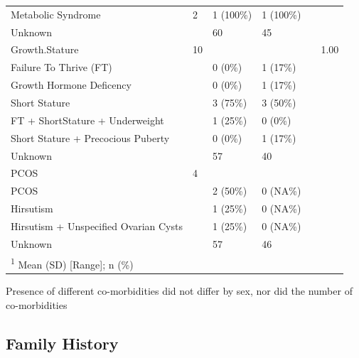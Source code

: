 \documentclass[
]{article}
\begin{document}
\begin{table}[!h]
\begin{tabular}[t]{llllll}
Metabolic Syndrome & 2 & 1 (100\%) & 1 (100\%) &  & \\
\addlinespace
\hspace{1em}Unknown &  & 60 & 45 &  & \\
Growth.Stature & 10 &  &  &  & 1.00\\
\hspace{1em}Failure To Thrive (FT) &  & 0 (0\%) & 1 (17\%) &  & \\
\hspace{1em}Growth Hormone Deficency &  & 0 (0\%) & 1 (17\%) &  & \\
\hspace{1em}Short Stature &  & 3 (75\%) & 3 (50\%) &  & \\
\addlinespace
\hspace{1em}FT + ShortStature + Underweight &  & 1 (25\%) & 0 (0\%) &  & \\
\hspace{1em}Short Stature + Precocious Puberty &  & 0 (0\%) & 1 (17\%) &  & \\
\hspace{1em}Unknown &  & 57 & 40 &  & \\
PCOS & 4 &  &  &  & \\
\hspace{1em}PCOS &  & 2 (50\%) & 0 (NA\%) &  & \\
\addlinespace
\hspace{1em}Hirsutism &  & 1 (25\%) & 0 (NA\%) &  & \\
\hspace{1em}Hirsutism + Unspecified Ovarian Cysts &  & 1 (25\%) & 0 (NA\%) &  & \\
\hspace{1em}Unknown &  & 57 & 46 &  & \\
\bottomrule
\multicolumn{6}{l}{\rule{0pt}{1em}\textsuperscript{1} Mean (SD)   [Range]; n (\%)}\\
\end{tabular}
\end{table}

Presence of different co-morbidities did not differ by sex, nor did the
number of co-morbidities

\FloatBarrier
\clearpage

\hypertarget{family-history-1}{%
\subsection{Family History}\label{family-history-1}}
\end{document}
